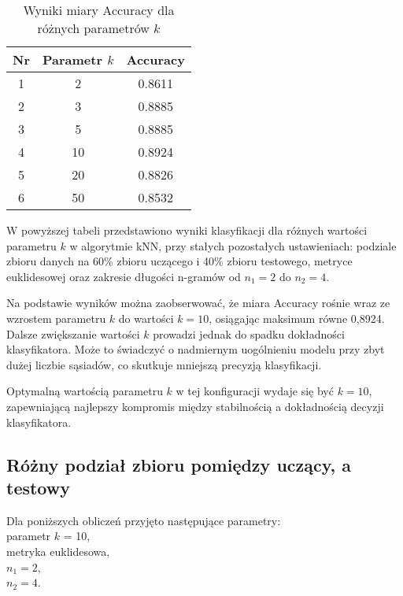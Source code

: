 \documentclass{article}
\begin{document}
\begin{table}[h!]
    \centering
    \begin{tabular}{|c|c|c|}
    \hline
    \textbf{Nr} & \textbf{Parametr \(k\)} & \textbf{Accuracy} \\ \hline
    1 & 2 & 0.8611\\ \hline
    2 & 3 & 0.8885 \\ \hline
    3 & 5 & 0.8885 \\ \hline
    4 & 10 & 0.8924 \\ \hline
    5 & 20 & 0.8826 \\ \hline
    6 & 50 & 0.8532 \\ \hline    
    \end{tabular}
    \caption{Wyniki miary Accuracy dla różnych parametrów \(k\)}
\end{table}
W powyższej tabeli przedstawiono wyniki klasyfikacji dla różnych wartości parametru \(k\) w algorytmie kNN, przy stałych pozostałych ustawieniach: podziale zbioru danych na 60\% zbioru uczącego i 40\% zbioru testowego, metryce euklidesowej oraz zakresie długości n-gramów od \(n_1 = 2\) do \(n_2 = 4\).

Na podstawie wyników można zaobserwować, że miara Accuracy rośnie wraz ze wzrostem parametru \(k\) do wartości \(k = 10\), osiągając maksimum równe 0{,}8924. Dalsze zwiększanie wartości \(k\) prowadzi jednak do spadku dokładności klasyfikatora. Może to świadczyć o nadmiernym uogólnieniu modelu przy zbyt dużej liczbie sąsiadów, co skutkuje mniejszą precyzją klasyfikacji.

Optymalną wartością parametru \(k\) w tej konfiguracji wydaje się być \(k = 10\), zapewniającą najlepszy kompromis między stabilnością a dokładnością decyzji klasyfikatora.

\subsection{Różny podział zbioru pomiędzy uczący, a testowy}
Dla poniższych obliczeń przyjęto następujące parametry:\\ parametr \(k\) = 10, \\metryka euklidesowa, \\\(n_1 = 2\),\\ \(n_2 = 4\). 
\end{document}
